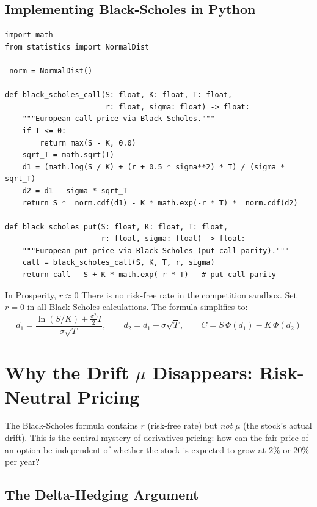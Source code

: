 \documentclass[12pt,a4paper,openany]{report}
\theoremstyle{definition}
\begin{document}
\subsection{Implementing Black-Scholes in Python}

\begin{lstlisting}
import math
from statistics import NormalDist

_norm = NormalDist()

def black_scholes_call(S: float, K: float, T: float,
                       r: float, sigma: float) -> float:
    """European call price via Black-Scholes."""
    if T <= 0:
        return max(S - K, 0.0)
    sqrt_T = math.sqrt(T)
    d1 = (math.log(S / K) + (r + 0.5 * sigma**2) * T) / (sigma * sqrt_T)
    d2 = d1 - sigma * sqrt_T
    return S * _norm.cdf(d1) - K * math.exp(-r * T) * _norm.cdf(d2)

def black_scholes_put(S: float, K: float, T: float,
                      r: float, sigma: float) -> float:
    """European put price via Black-Scholes (put-call parity)."""
    call = black_scholes_call(S, K, T, r, sigma)
    return call - S + K * math.exp(-r * T)   # put-call parity
\end{lstlisting}

\begin{warningbox}{In Prosperity, $r \approx 0$}
There is no risk-free rate in the competition sandbox. Set $r = 0$ in all Black-Scholes calculations. The formula simplifies to:
\[
  d_1 = \frac{\ln(S/K) + \frac{\sigma^2}{2}T}{\sigma\sqrt{T}}, \qquad d_2 = d_1 - \sigma\sqrt{T}, \qquad C = S\,\Phi(d_1) - K\,\Phi(d_2)
\]
\end{warningbox}

\section{Why the Drift $\mu$ Disappears: Risk-Neutral Pricing}

The Black-Scholes formula contains $r$ (risk-free rate) but \emph{not} $\mu$ (the stock's actual drift). This is the central mystery of derivatives pricing: how can the fair price of an option be independent of whether the stock is expected to grow at 2\% or 20\% per year?

\subsection{The Delta-Hedging Argument}
\end{document}
